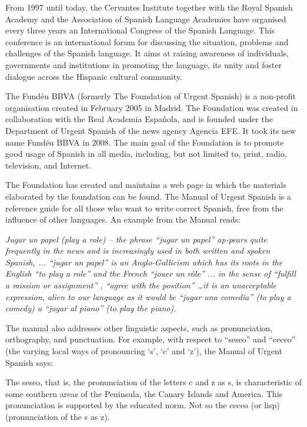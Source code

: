 \begin{multicols}{2}
From 1997 until today, the Cervantes Institute together with the Royal Spanish Academy and the Association of Spanish Language Academies have organised every three years an International Congress of the Spanish Language. This conference is an international forum for discussing the situation, problems and challenges of the Spanish language. It aims at raising awareness of individuals, governments and institutions in promoting the language, its unity and foster dialogue across the Hispanic cultural community.


The Fundéu BBVA (formerly The Foundation of Urgent Spanish) \cite{fundeu} is a non-profit organisation created in February 2005 in Madrid. The Foundation was created in collaboration with the Real Academia Española, and is founded under the Department of Urgent Spanish of the news agency Agencia EFE. It took its new name Fundéu BBVA in 2008. The main goal of the Foundation is to promote good usage of Spanish in all media, including, but not limited to, print, radio, television, and Internet.

The Foundation has created and maintains a web page in which the materials elaborated by the foundation can be found. The Manual of Urgent Spanish is a reference guide for all those who want to write correct Spanish, free from the influence of other languages. An example from the Manual reads:

\textit{Jugar un papel (play a role) -- the phrase “jugar un papel” ap-pears quite frequently in the news and is increasingly used in both written and spoken Spanish,  ... “jugar un papel” is an Anglo-Gallicism which has its roots in the English "`to play a role"' and the French "`jouer un rôle"' ... in the sense of "`fulfill a mission or assignment"' , "`agree with the position"' \ldots it is an unacceptable expression, alien to our language as it would be “jugar una comedia” (to play a comedy) o “jugar al piano” (to play the piano).}

The manual also addresses other linguistic aspects, such as pronunciation, orthography, and punctuation. For example, with respect to “seseo” and “ceceo” (the varying local ways of pronouncing ‘s’, ‘c’ and ‘z’), the Manual of Urgent Spanish says:

The seseo, that is, the pronunciation of the letters c and z as s, is characteristic of some southern areas of the Peninsula, the Canary Islands and America. This pronunciation is supported by the educated norm. Not so the ceceo (or lisp) (pronunciation of the s as z).


\end{multicols}
